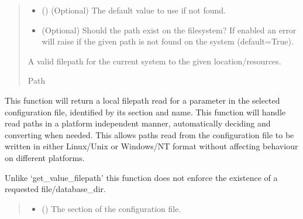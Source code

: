 \documentclass[letterpaper,10pt,english]{sphinxmanual}
\begin{document}
\begin{fulllineitems}
\begin{fulllineitems}
\begin{quote}
\begin{description}
\begin{itemize}
\item {} 
\sphinxAtStartPar
{} () \textendash{} (Optional) The default value to use if not found.

\item {} 
\sphinxAtStartPar
{} \textendash{} (Optional) Should the path exist on the filesystem?
If enabled an error will raise if the given path is not found on
the system (default=True).

\end{itemize}

\sphinxAtStartPar
A valid filepath for the current system to the given
location/resources.

\sphinxAtStartPar
Path

\end{description}\end{quote}

\end{fulllineitems}


\begin{fulllineitems}
\label{\detokenize{modules/input/config_handler:qnav.input.config_handler.ConfigHandler.get_value_filepath_str}}
\pysigstartsignatures
{}
\pysigstopsignatures
\sphinxAtStartPar
This function will return a local filepath read for a parameter in the
selected configuration file, identified by its section and name. This
function will handle read paths in a platform independent manner,
automatically deciding and converting when needed. This allows paths
read from the configuration file to be written in either Linux/Unix or
Windows/NT format without affecting behaviour on different platforms.

\sphinxAtStartPar
Unlike ‘get\_value\_filepath’ this function does not enforce the
existence of a requested file/database\_dir.
\begin{quote}\begin{description}
\begin{itemize}
\item {} 
\sphinxAtStartPar
{} () \textendash{} The section of the configuration file.


\end{itemize}
\end{description}
\end{quote}
\end{fulllineitems}
\end{fulllineitems}
\end{document}
